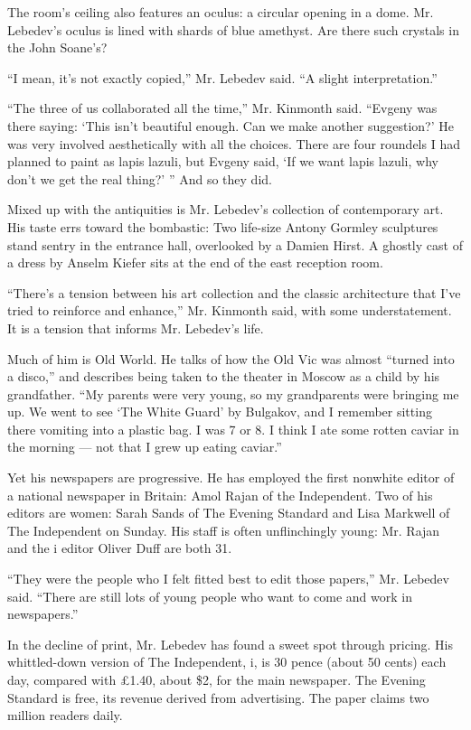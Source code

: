 The room's ceiling also features an oculus: a circular opening in a
dome. Mr. Lebedev's oculus is lined with shards of blue amethyst. Are
there such crystals in the John Soane's?

``I mean, it's not exactly copied,'' Mr. Lebedev said. ``A slight
interpretation.''

``The three of us collaborated all the time,'' Mr. Kinmonth said.
``Evgeny was there saying: `This isn't beautiful enough. Can we make
another suggestion?' He was very involved aesthetically with all the
choices. There are four roundels I had planned to paint as lapis lazuli,
but Evgeny said, `If we want lapis lazuli, why don't we get the real
thing?' '' And so they did.

Mixed up with the antiquities is Mr. Lebedev's collection of
contemporary art. His taste errs toward the bombastic: Two life-size
Antony Gormley sculptures stand sentry in the entrance hall, overlooked
by a Damien Hirst. A ghostly cast of a dress by Anselm Kiefer sits at
the end of the east reception room.

``There's a tension between his art collection and the classic
architecture that I've tried to reinforce and enhance,'' Mr. Kinmonth
said, with some understatement. It is a tension that informs Mr.
Lebedev's life.

Much of him is Old World. He talks of how the Old Vic was almost
``turned into a disco,'' and describes being taken to the theater in
Moscow as a child by his grandfather. ``My parents were very young, so
my grandparents were bringing me up. We went to see `The White Guard' by
Bulgakov, and I remember sitting there vomiting into a plastic bag. I
was 7 or 8. I think I ate some rotten caviar in the morning --- not that
I grew up eating caviar.''

Yet his newspapers are progressive. He has employed the first nonwhite
editor of a national newspaper in Britain: Amol Rajan of the
Independent. Two of his editors are women: Sarah Sands of The Evening
Standard and Lisa Markwell of The Independent on Sunday. His staff is
often unflinchingly young: Mr. Rajan and the i editor Oliver Duff are
both 31.

``They were the people who I felt fitted best to edit those papers,''
Mr. Lebedev said. ``There are still lots of young people who want to
come and work in newspapers.''

In the decline of print, Mr. Lebedev has found a sweet spot through
pricing. His whittled-down version of The Independent, i, is 30 pence
(about 50 cents) each day, compared with £1.40, about \$2, for the main
newspaper. The Evening Standard is free, its revenue derived from
advertising. The paper claims two million readers daily.

